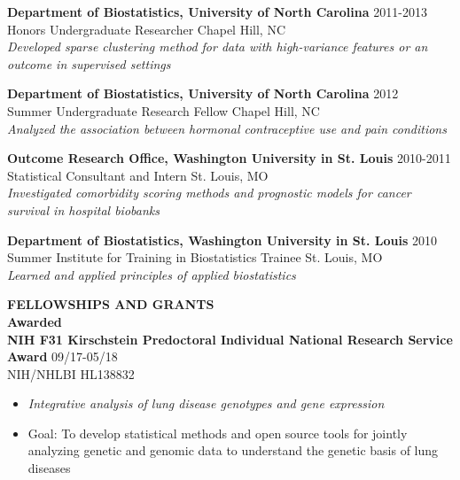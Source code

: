 \documentclass[10pt]{article}
\begin{document}
\textbf{Department of Biostatistics, University of North Carolina} \hfill 2011-2013\\
\indent Honors Undergraduate Researcher \hfill Chapel Hill, NC\\
\indent \textit{Developed sparse clustering method for data with high-variance features or an outcome in supervised settings \\}

\textbf{Department of Biostatistics, University of North Carolina} \hfill 2012\\
\indent Summer Undergraduate Research Fellow \hfill Chapel Hill, NC\\
\indent \textit{Analyzed the association between hormonal contraceptive use and pain conditions \\}

\textbf{Outcome Research Office, Washington University in St. Louis} \hfill 2010-2011\\
\indent Statistical Consultant and Intern \hfill St. Louis, MO\\
\indent \textit{Investigated comorbidity scoring methods and prognostic models for cancer survival in hospital biobanks \\}

\textbf{Department of Biostatistics, Washington University in St. Louis} \hfill 2010\\
\indent Summer Institute for Training in Biostatistics Trainee \hfill St. Louis, MO\\
\indent \textit{Learned and applied principles of applied biostatistics \\}

\vspace{0.25cm}


{\bf FELLOWSHIPS AND GRANTS} \hrulefill \\

\indent \textbf{Awarded} \\

\textbf{NIH F31 Kirschstein Predoctoral Individual National Research Service Award} \hfill 09/17-05/18\\
\indent NIH/NHLBI HL138832
\begin{itemize}
	\item \textit{Integrative analysis of lung disease genotypes and gene expression}
	\item Goal: To develop statistical methods and open source tools for jointly analyzing genetic and genomic data to understand the genetic basis of lung diseases\\
\end{itemize}
\end{document}

